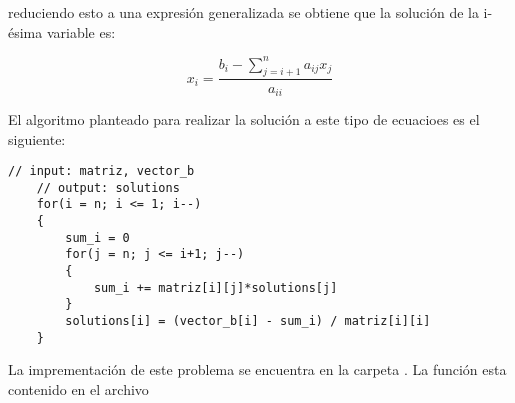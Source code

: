 reduciendo esto a una expresión generalizada se obtiene que la solución de la i-ésima variable es:

\begin{equation*}
    x_i = \frac{b_{i}-\sum\limits_{j=i+1}^n a_{ij}x_{j}}{a_{ii}}
\end{equation*}

El algoritmo planteado para realizar la solución a este tipo de ecuacioes es el siguiente:

\begin{lstlisting}[style=CStyle]
    // input: matriz, vector_b
    // output: solutions
    for(i = n; i <= 1; i--)
    {
        sum_i = 0
        for(j = n; j <= i+1; j--)
        {
            sum_i += matriz[i][j]*solutions[j]
        }
        solutions[i] = (vector_b[i] - sum_i) / matriz[i][i]
    }

\end{lstlisting}

La imprementación de este problema se encuentra en la carpeta . La función  esta contenido en el archivo 